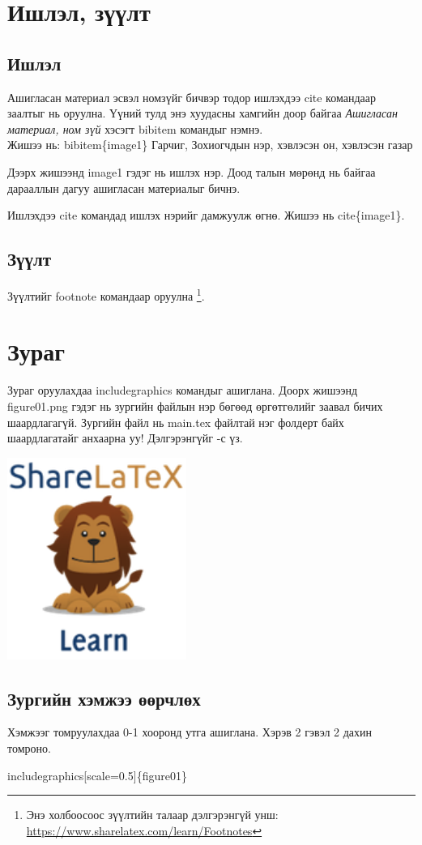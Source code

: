 \documentclass[12pt,A4]{report}
\begin{document}
\chapter{Ишлэл, зүүлт}
\section{Ишлэл}
Ашигласан материал эсвэл номзүйг бичвэр тодор ишлэхдээ cite командаар заалтыг нь оруулна.
Үүний тулд энэ хуудасны хамгийн доор байгаа \textit{Ашигласан материал, ном зүй} хэсэгт
bibitem командыг нэмнэ. \\


Жишээ нь: bibitem\{image1\} Гарчиг, Зохиогчдын нэр, хэвлэсэн он, хэвлэсэн газар

Дээрх жишээнд image1 гэдэг нь ишлэх нэр. Доод талын мөрөнд нь байгаа дарааллын дагуу
ашигласан материалыг бичнэ.

Ишлэхдээ cite командад ишлэх нэрийг дамжуулж өгнө. Жишээ нь cite\{image1\}.
\section{Зүүлт}
Зүүлтийг footnote командаар оруулна \footnote{Энэ холбоосоос зүүлтийн талаар дэлгэрэнгүй унш: \url{https://www.sharelatex.com/learn/Footnotes}}.

\chapter{Зураг}
Зураг оруулахдаа includegraphics командыг ашиглана. Доорх жишээнд figure01.png гэдэг нь зургийн файлын нэр бөгөөд өргөтгөлийг заавал бичих шаардлагагүй. Зургийн файл нь main.tex файлтай нэг фолдерт байх шаардлагатайг анхаарна уу! Дэлгэрэнгүйг \cite{image1}-с үз.

\includegraphics{figure01.png}


\section{Зургийн хэмжээ өөрчлөх}
Хэмжээг томруулахдаа 0-1 хооронд утга ашиглана. Хэрэв 2 гэвэл 2 дахин томроно.
\begin{center}
	includegraphics[scale=0.5]\{figure01\}
\end{center}
\end{document}
